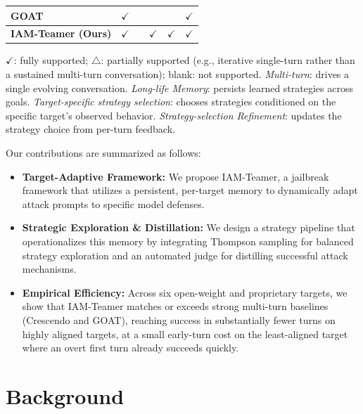 \documentclass[a4paper,fleqn]{cas-sc}
\begin{document}
\begin{table}[htbp]
\begin{tabular}{lccccc}
    GOAT~\cite{goat}                              & $\checkmark$       &                                      &                           &                                              & $\checkmark$                             \\
    \midrule
    \textbf{IAM-Teamer (Ours)}                    & $\checkmark$       &                                      & $\checkmark$              & $\checkmark$                                 & $\checkmark$                             \\
    \bottomrule
  \end{tabular}

  \begin{minipage}{\linewidth}
    \footnotesize $\checkmark$: fully supported; $\triangle$: partially supported (e.g., iterative single-turn rather than a sustained multi-turn conversation); blank: not supported. \emph{Multi-turn}: drives a single evolving conversation. \emph{Long-life Memory}: persists learned strategies across goals. \emph{Target-specific strategy selection}: chooses strategies conditioned on the specific target's observed behavior. \emph{Strategy-selection Refinement}: updates the strategy choice from per-turn feedback.
  \end{minipage}
\end{table}

Our contributions are summarized as follows:
\begin{itemize}
  \item \textbf{Target-Adaptive Framework:} We propose IAM-Teamer, a jailbreak framework that utilizes a persistent, per-target memory to dynamically adapt attack prompts to specific model defenses.
  \item \textbf{Strategic Exploration \& Distillation:} We design a strategy pipeline that operationalizes this memory by integrating Thompson sampling for balanced strategy exploration and an automated judge for distilling successful attack mechanisms.
  \item \textbf{Empirical Efficiency:} Across six open-weight and proprietary targets, we show that IAM-Teamer matches or exceeds strong multi-turn baselines (Crescendo and GOAT), reaching success in substantially fewer turns on highly aligned targets, at a small early-turn cost on the least-aligned target where an overt first turn already succeeds quickly.
\end{itemize}
\section{Background}
\label{sec:background}
\end{document}
